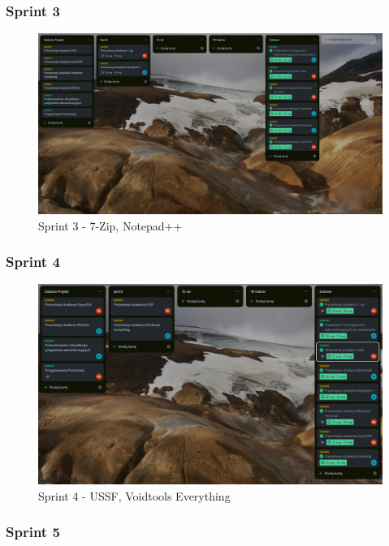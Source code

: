\documentclass[0.82pt,a4paper]{article}
\begin{document}
\subsubsection{Sprint 3}

    \begin{figure}[H]
        \centering
        \includegraphics[width=0.8\linewidth]{media/Trello_screeny/Sprint3.PNG}
        \caption[Sprint3]{Sprint 3 - 7-Zip, Notepad++}
        \label{fig:sprint3}
    \end{figure}
    
\subsubsection{Sprint 4}

    \begin{figure}[H]
        \centering
        \includegraphics[width=0.8\linewidth]{media/Trello_screeny/Sprint5.PNG}
        \caption[Sprint4]{Sprint 4 - USSF, Voidtools Everything}
        \label{fig:sprint4}
    \end{figure}
    
\subsubsection{Sprint 5}
\end{document}
